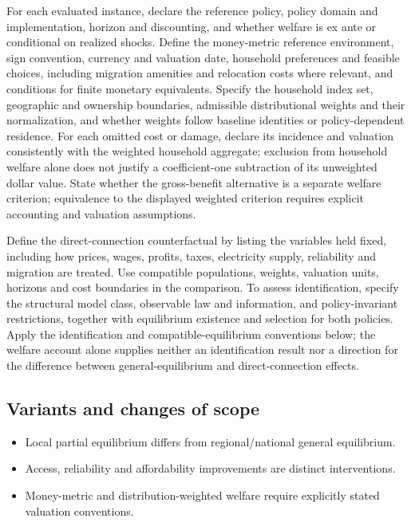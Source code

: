 \documentclass[11pt,a4paper]{article}
\begin{document}
For each evaluated instance, declare the reference policy, policy domain and implementation, horizon and discounting, and whether welfare is ex ante or conditional on realized shocks. Define the money-metric reference environment, sign convention, currency and valuation date, household preferences and feasible choices, including migration amenities and relocation costs where relevant, and conditions for finite monetary equivalents. Specify the household index set, geographic and ownership boundaries, admissible distributional weights and their normalization, and whether weights follow baseline identities or policy-dependent residence. For each omitted cost or damage, declare its incidence and valuation consistently with the weighted household aggregate; exclusion from household welfare alone does not justify a coefficient-one subtraction of its unweighted dollar value. State whether the gross-benefit alternative is a separate welfare criterion; equivalence to the displayed weighted criterion requires explicit accounting and valuation assumptions.

Define the direct-connection counterfactual by listing the variables held fixed, including how prices, wages, profits, taxes, electricity supply, reliability and migration are treated. Use compatible populations, weights, valuation units, horizons and cost boundaries in the comparison. To assess identification, specify the structural model class, observable law and information, and policy-invariant restrictions, together with equilibrium existence and selection for both policies. Apply the identification and compatible-equilibrium conventions below; the welfare account alone supplies neither an identification result nor a direction for the difference between general-equilibrium and direct-connection effects.

\subsection*{Variants and changes of scope}

\begin{itemize}
\item Local partial equilibrium differs from regional/national general equilibrium.
\item Access, reliability and affordability improvements are distinct interventions.
\item Money-metric and distribution-weighted welfare require explicitly stated valuation conventions.
\end{itemize}
\end{document}
